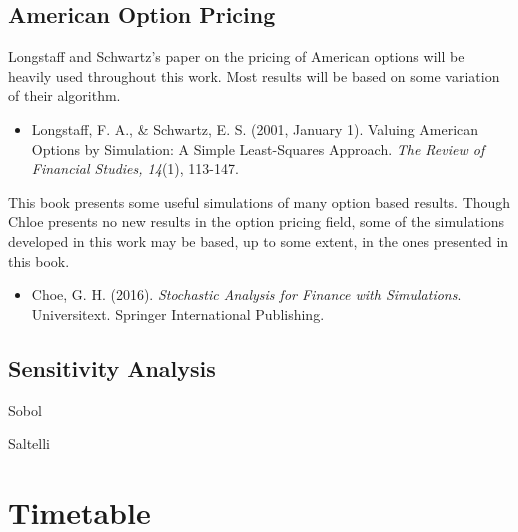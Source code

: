 \documentclass[a4paper,prd,twocolumn,nofootinbib,superscriptaddress,floatfix]{revtex4}
\begin{document}
\subsection{American Option Pricing}
Longstaff and Schwartz's paper on the pricing of American options will be heavily used throughout this work. Most results will be based on some variation of their algorithm.
\begin{itemize}
\item Longstaff, F. A., \& Schwartz, E. S. (2001, January 1). Valuing American Options by Simulation: A Simple Least-Squares Approach. \textit{The Review of Financial Studies, 14}(1), 113-147.
\end{itemize}

This book presents some useful simulations of many option based results. Though Chloe presents no new results in the option pricing field, some of the simulations developed in this work may be based, up to some extent, in the ones presented in this book.
\begin{itemize}
\item Choe, G. H. (2016). \textit{Stochastic Analysis for Finance with Simulations}. Universitext. Springer International Publishing. 
\end{itemize}

\subsection{Sensitivity Analysis}
Sobol


Saltelli

\section{Timetable}

\end{document}
